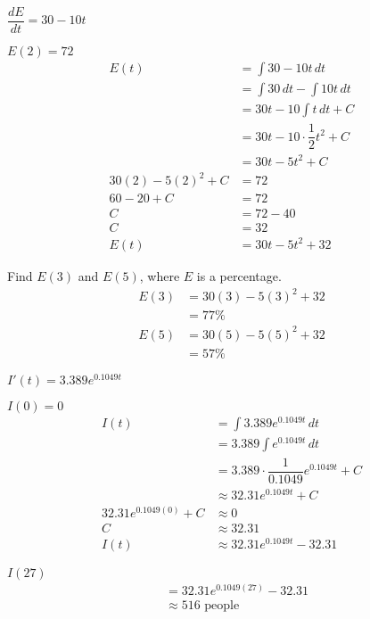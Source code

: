 \documentclass[12pt]{article}
\newenvironment{problem}[2][]{
    \begin{trivlist}
        \item[
            {\bfseries #1}
            {\bfseries #2.}
        ]
}{\end{trivlist}}
\begin{document}
\newpage

\begin{problem}{67}
$\dfrac{dE}{dt} = 30 - 10t$
\end{problem}

\begin{problem}{a)}
$E(2) = 72$
\begin{align}
E(t) &= \int 30 - 10t \, dt \\
&= \int 30 \, dt - \int 10t \, dt \\
&= 30t - 10 \int t \, dt + C \\
&= 30t - 10 \cdot \dfrac{1}{2} t^2 + C \\
&= 30t - 5t^2 + C \\
30(2) - 5(2)^2 + C &= 72 \\
60 - 20 + C &= 72 \\
C &= 72 - 40 \\
C &= 32 \\
E(t) &= 30t - 5t^2 + 32 
\end{align}
\end{problem}

\begin{problem}{b)}
Find $E(3)$ and $E(5)$, where $E$ is a percentage.
\begin{align}
E(3) &= 30(3) - 5(3)^2 + 32 \\
&= 77\% \\
E(5) &= 30(5) - 5(5)^2 + 32 \\
&= 57\%
\end{align}
\end{problem}

\begin{problem}{69}
$I'(t) = 3.389e^{0.1049t}$
\end{problem}

\begin{problem}{a)}
$I(0) = 0$
\begin{align}
I(t) &= \int 3.389e^{0.1049t} \, dt \\
&= 3.389 \int e^{0.1049t} \, dt \\
&= 3.389 \cdot \dfrac{1}{0.1049} e^{0.1049t} + C \\
&\approx 32.31e^{0.1049t} + C \\
32.31e^{0.1049(0)} + C &\approx 0 \\
C &\approx 32.31 \\
I(t) &\approx 32.31e^{0.1049t} - 32.31
\end{align}
\end{problem}

\begin{problem}{b)}
$I(27)$
\begin{align}
&= 32.31e^{0.1049(27)} - 32.31 \\
&\approx 516 \text{ people}
\end{align}
\end{problem}
\end{document}
